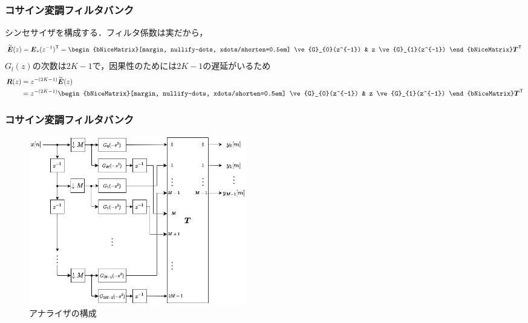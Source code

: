 \documentclass[14pt,xcolor=dvipsnames,table,dvipdfmx]{beamer}
\begin{document}
\begin{frame}[c]
    \frametitle{コサイン変調フィルタバンク}
    シンセサイザを構成する．フィルタ係数は実だから，
    \begin{align}
        \widetilde{\ve{E}}(z) = \ve{E}_{\ast}(z^{-1})^{\mathsf{T}} = 
        \begin{bNiceMatrix}[margin, nullify-dots, xdots/shorten=0.5em]
            \ve{G}_{0}(z^{-1}) & z \ve{G}_{1}(z^{-1})
        \end{bNiceMatrix}
        \ve{T}^{\mathsf{T}}
    \end{align}
    $G_{l}(z)$の次数は$2K - 1$で，因果性のためには$2K - 1$の遅延がいるため
    \begin{align}
        \ve{R}(z) &= z^{-(2K-1)} \widetilde{\ve{E}}(z) \nonumber \\
        &=
        z^{-(2K-1)} 
        \begin{bNiceMatrix}[margin, nullify-dots, xdots/shorten=0.5em]
            \ve{G}_{0}(z^{-1}) & z \ve{G}_{1}(z^{-1})
        \end{bNiceMatrix}
        \ve{T}^{\mathsf{T}} \label{eq:synthesizer_matrix_of_cos_modulated_filter_bank}
    \end{align}
\end{frame}

\begin{frame}[c]
    \frametitle{コサイン変調フィルタバンク}
    \begin{figure}
        \includegraphics[width=95mm]{./figs/cos_modulated_analysis_bank_filter.drawio.png}
        \caption*{アナライザの構成}
    \end{figure}
\end{frame}
\end{document}
